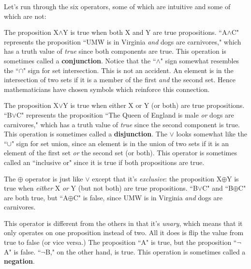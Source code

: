 Let's run through the six operators, some of which are intuitive and some
of which are not:

\begin{description}

\item[$\wedge$ (``and")] The proposition X$\wedge$Y is true when both X and
Y are true propositions. ``A$\wedge$C" represents the proposition ``UMW is
in Virginia \textit{and} dogs are carnivores," which has a truth value of
\textsl{true} since both components are true. This operation is sometimes
called a \textbf{conjunction}. Notice that the ``$\wedge$"
sign somewhat resembles the ``$\cap$" sign for set intersection. This is
not an accident. An element is in the intersection of two sets if it is a
member of the first \textit{and} the second set. Hence mathematicians have
chosen symbols which reinforce this connection.

\item[$\vee$ (``or")] The proposition X$\vee$Y is true when either X or Y
(or both) are true propositions. ``B$\vee$C" represents the proposition
``The Queen of England is male \textit{or} dogs are carnivores," which has
a truth value of \textsl{true} since the second component is true. This
operation is sometimes called a \textbf{disjunction}. The
$\vee$ looks somewhat like the ``$\cup$" sign for set union, since an
element is in the union of two sets if it is an element of the first set
\textit{or} the second set (or both). This operator is sometimes called an
``inclusive or" since it is true if both propositions are true.

\item[$\oplus$ (``xor")] The $\oplus$ operator is just like $\vee$ except
that it's \textit{exclusive}: the proposition X$\oplus$Y is true when
\textit{either} X \textit{or} Y (but not both) are true propositions. 
``B$\vee$C" and ``B$\oplus$C" are both true, but ``A$\oplus$C" is false,
since UMW is in Virginia \textit{and} dogs are carnivores.

\item[$\neg$ (``not")] This operator is different from the others in that
it's \textit{unary}, which means that it only operates on one proposition
instead of two. All it does is flip the value from true to false (or vice
versa.) The proposition ``A" is true, but the proposition ``$\neg$A" is
false. ``$\neg$B," on the other hand, is true. This operation is sometimes
called a \textbf{negation}.


\end{description}
